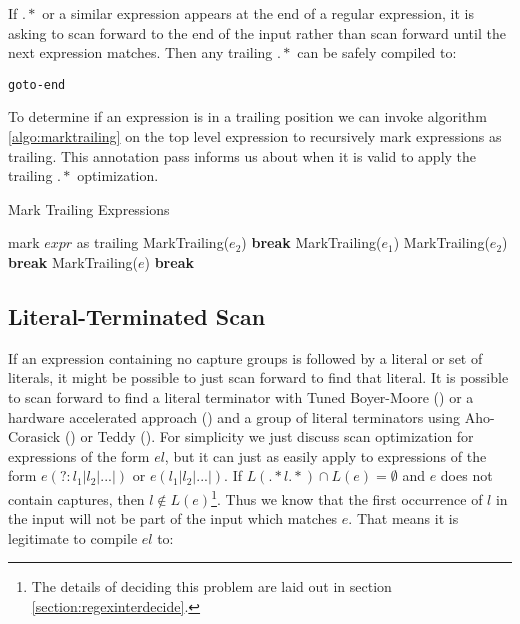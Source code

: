 If $.*$ or a similar expression appears at the end of a regular expression,
it is asking to scan forward to the end of the input rather than scan
forward until the next expression matches. Then any trailing $.*$ can
be safely compiled to:

\begin{verbatim}
goto-end
\end{verbatim}

\noindent
To determine if an expression is in a trailing position we can 
invoke algorithm \ref{algo:marktrailing} on the top level expression
to recursively mark expressions as trailing. This annotation pass
informs us about when it is valid to apply the trailing $.*$ optimization.

\begin{algorithm}
\caption{Mark Trailing Expressions} \label{algo:marktrailing}
\begin{algorithmic}
  \State mark $expr$ as trailing
      \State MarkTrailing($e_2$)
      \State \textbf{break}
    \EndCase
      \State MarkTrailing($e_1$)
      \State MarkTrailing($e_2$)
      \State \textbf{break}
    \EndCase
    \EndCase
    \EndCase
    \EndCase
    \EndCase
      \State MarkTrailing($e$)
      \State \textbf{break}
    \EndCase
    \Case{$\epsilon$}
    \EndCase
    \Case{$\alpha$}
    \EndCase
    \EndCase
  \EndSwitch

\EndProcedure
\end{algorithmic}
\end{algorithm}

\subsection{Literal-Terminated Scan}
\label{section:littermscan}

If an expression containing no capture groups is followed by a
literal or set of literals, it might be possible to just scan forward
to find that literal. It is possible to scan forward to find a literal
terminator with Tuned Boyer-Moore (\cite{Hume1991}) or a hardware
accelerated approach (\cite{GallantRegex}) and a group of literal
terminators using Aho-Corasick (\cite{Aho1975}) or Teddy (\cite{Teddy}).
For simplicity we just discuss scan optimization for expressions of
the form $el$, but it can just as easily apply to expressions of the
form $e(?:l_1|l_2|...|)$ or $e(l_1|l_2|...|)$.
If $L(.*l.*) \cap L(e) = \emptyset$ and $e$ does
not contain captures, then $l \not\in L(e)$\footnote{The details of deciding
this problem are laid out in section \ref{section:regexinterdecide}.}.
Thus we know that the first occurrence of $l$
in the input will not be part of the input which matches $e$. That means
it is legitimate to compile $el$ to:

